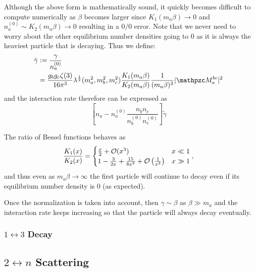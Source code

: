 \documentclass[
  a4paper,             %
  11pt,                %
  oneside,             %
  onecolumn,           %
  bibliography=totoc,  %
  final,               %
]{scrartcl}
\begin{document}
Although the above form is mathematically sound, it quickly becomes difficult to
compute numerically as \(\beta\) becomes larger since \(K_1(m_a \beta) \to 0\)
and \(n_a^{(0)} \sim K_2(m_a \beta) \to 0\) resulting in a \(0 / 0\) error.
Note that we never need to worry about the other equilibrium number densities
going to 0 as it is always the heaviest particle that is decaying.  Thus we
define:
\begin{equation}
  \begin{aligned}
    \tilde\gamma &\defeq \frac{\gamma}{n_a^{(0)}} \\
    &= \frac{g_b g_c \zeta(3)}{16 \pi^3} \lambda^{\frac{1}{2}}(m_a^2, m_b^2, m_c^2) \frac{K_1(m_a \beta)}{K_2(m_a \beta)} \frac{1}{(m_a \beta)^3} \abs{\pzcM_a^{bc}}^2
  \end{aligned}
\end{equation}
and the interaction rate therefore can be expressed as
\begin{equation}
  \left[ n_a - n_a^{(0)} \frac{n_b n_c}{n_b^{(0)} n_c^{(0)}} \right] \tilde \gamma
\end{equation}

The ratio of Bessel functions behaves as
\begin{equation}
  \frac{K_1(x)}{K_2(x)} = \begin{cases}
    \frac{x}{2} + \mathcal{O}(x^3)                                              & x \ll 1 \\
    1 - \frac{3}{2x} + \frac{15}{8 x^2} + \mathcal{O}\left(\frac{1}{x^3}\right) & x \gg 1
  \end{cases},
\end{equation}
and thus even as \(m_a \beta \to \infty\) the first particle will continue to
decay even if its equilibrium number density is 0 (as expected).

Once the normalization is taken into account, then \(\gamma \sim \beta\) as
\(\beta \gg m_a\) and the interaction rate keeps increasing so that the particle
will always decay eventually.

\subsubsection{\texorpdfstring{\(1 \leftrightarrow 3\)}{1 to 3} Decay}%
\label{sec:1-to-3_decay}


\subsection{\texorpdfstring{\(2 \leftrightarrow n\)}{1 to n} Scattering}%
\label{sec:2-to-n_scattering}
\end{document}
